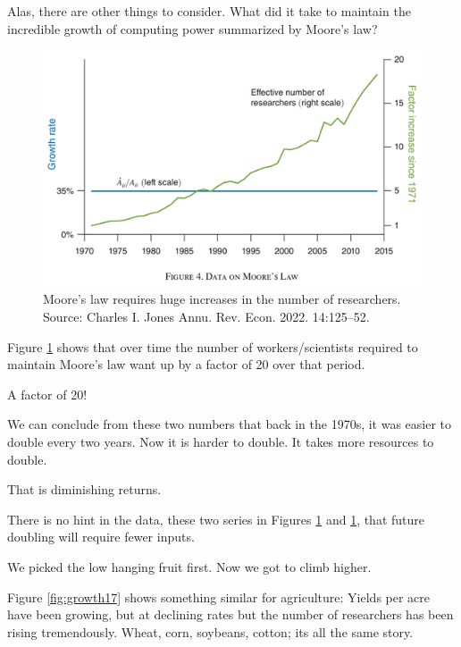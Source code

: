 \documentclass[
]{book}
\begin{document}
Alas, there are other things to consider. What did it take to maintain the incredible growth of computing power summarized by Moore's law?

\begin{figure}

{\centering \includegraphics[width=1\linewidth]{img/growth/moore16} 

}

\caption{Moore’s law requires huge increases in the number of researchers. Source: Charles I. Jones Annu. Rev. Econ. 2022. 14:125–52.}\label{fig:growth16}
\end{figure}

Figure \ref{fig:growth16} shows that over time the number of workers/scientists required to maintain Moore's law want up by a factor of 20 over that period.

A factor of 20!

We can conclude from these two numbers that back in the 1970s, it was easier to double every two years. Now it is harder to double. It takes more resources to double.

That is diminishing returns.

There is no hint in the data, these two series in Figures \ref{fig:growth16} and \ref{fig:growth16}, that future doubling will require fewer inputs.

We picked the low hanging fruit first. Now we got to climb higher.

Figure \ref{fig:growth17} shows something similar for agriculture: Yields per acre have been growing, but at declining rates but the number of researchers has been rising tremendously. Wheat, corn, soybeans, cotton; its all the same story.
\end{document}
